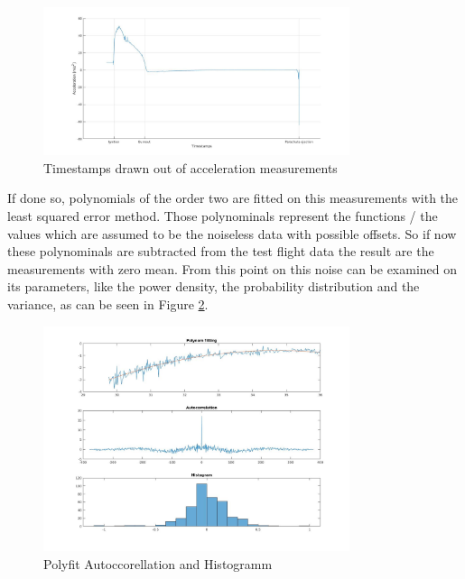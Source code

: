 \begin{figure}[h!]
 \centering
 \includegraphics[width=0.8\textwidth]{./Pictures/AccelerationMarks.jpg}
 \caption{Timestamps drawn out of acceleration measurements}
 \label{fig:AccelerationMarks}
\end{figure}


If done so, polynomials of the order two are fitted on this measurements with the least squared error method.
Those polynominals represent the functions / the values which are assumed to be the noiseless data with possible offsets.
So if now these polynominals are subtracted from the test flight data the result are the measurements with zero mean.
From this point on this noise can be examined on its parameters, like the power density, the probability distribution and the variance, as can be seen in Figure \ref{fig:PF_AC_HIST_Accel}.

\begin{figure}[h!]
 \centering
 \includegraphics[width=0.8\textwidth]{./Pictures/PF_AC_HIST_Accel.jpg}
 \caption{Polyfit Autoccorellation and Histogramm}
 \label{fig:PF_AC_HIST_Accel}
\end{figure}


